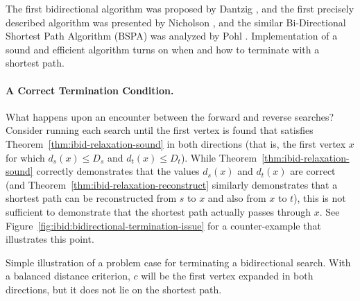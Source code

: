 The first bidirectional algorithm
was proposed by Dantzig \citep{dantzig1963linearprogramming},
and the first precisely described algorithm was presented by
Nicholson \citep{nicholson1966shortest},
and the similar Bi-Directional Shortest Path Algorithm (BSPA)
was analyzed by Pohl \citep{pohl1971bidirectional}.
Implementation of a sound and efficient algorithm
turns on when and how to terminate with a shortest path.

\paragraph{A Correct Termination Condition.}
What happens upon an encounter between the forward and reverse searches?
Consider running each search until the first vertex is found
that satisfies Theorem~\ref{thm:ibid-relaxation-sound} in both
directions
(that is, the first vertex $x$ for which
$d_s(x) \leq D_s$ and $d_t(x) \leq D_t$).
While Theorem~\ref{thm:ibid-relaxation-sound} correctly demonstrates
that the values $d_s(x)$ and $d_t(x)$ are correct
(and Theorem~\ref{thm:ibid-relaxation-reconstruct} similarly
demonstrates that a shortest path can be reconstructed from $s$ to $x$
and also from $x$ to $t$),
this is not sufficient to demonstrate that the shortest path
actually passes through $x$.
See Figure~\ref{fig:ibid:bidirectional-termination-issue} for a
counter-example that illustrates this point.

\begin{marginfigure}
   \centering
   \caption{Simple illustration of a problem case for terminating
      a bidirectional search.
      With a balanced distance criterion,
      $c$ will be the first vertex expanded in both directions,
      but it does not lie on the shortest path.}
   \label{fig:ibid:bidirectional-termination-issue}
\end{marginfigure}

